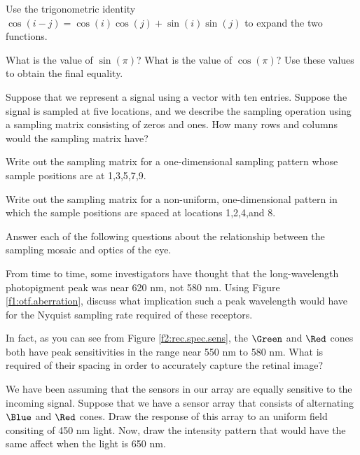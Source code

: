  \item  Use the trigonometric identity 
$\cos (i - j) = \cos(i) \cos(j) + \sin(i) \sin (j)$
to expand the two functions.


 \item What is the value of $\sin ( \pi )$?
What is the value of $\cos( \pi )$?
Use these values to obtain the final equality.

 \item Suppose that we represent a signal using a vector with
ten entries.  Suppose the signal is sampled at
five locations, and we describe the sampling operation
using a sampling matrix consisting of zeros and ones.
How many rows and columns would the sampling matrix have?

 \item Write out the sampling matrix for a one-dimensional
sampling pattern whose sample positions are at 1,3,5,7,9.

 \item Write out the sampling matrix for a non-uniform, one-dimensional
pattern in which the sample positions are spaced at locations
1,2,4,and 8.

 \ee

\item Answer each of the following questions
about the relationship between the
sampling mosaic and optics of the eye.

 \be

 \item From time to time, some investigators 
have thought that the long-wavelength
photopigment peak was near 620 nm, not 580 nm.
Using Figure \ref{f1:otf.aberration},
discuss what implication such a peak wavelength would
have for the Nyquist sampling rate
required of these receptors.

 \item In fact, as you can see from Figure \ref{f2:rec.spec.sens},
the $\Green$ and $\Red$ cones
both have peak sensitivities in the range near 550 nm to 580 nm.
What is required of their spacing in order to accurately
capture the retinal image?

 \item We have been assuming that the sensors in our array are
equally sensitive to the incoming signal.
Suppose that we have a sensor array that
consists of alternating $\Blue$ and $\Red$ cones.
Draw the response of this array to an uniform field
consiting of 450 nm light.
Now, draw the intensity pattern
that would have the same affect
when the light is 650 nm.

